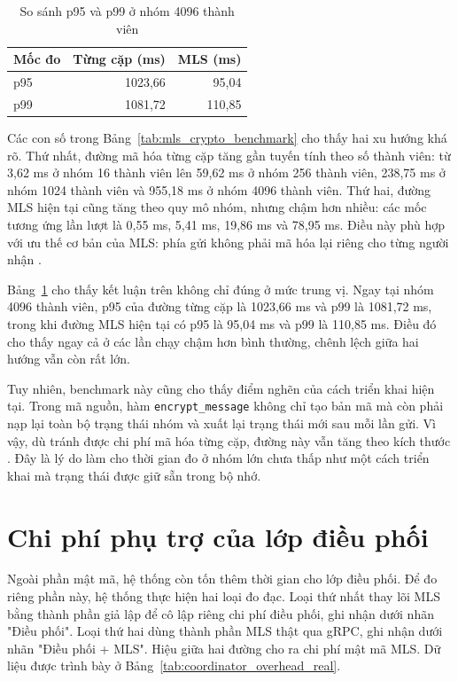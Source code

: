 \documentclass[../DoAn.tex]{subfiles}
\begin{document}
\begin{table}[htbp]
	\centering
	\caption{So sánh p95 và p99 ở nhóm 4096 thành viên}
	\label{tab:mls_crypto_tail_latency}
	\begin{tabular}{|l|r|r|}
		\hline
		\textbf{Mốc đo} & \textbf{Từng cặp (ms)} & \textbf{MLS (ms)} \\
		\hline
		p95 & 1023,66 & 95,04 \\
		\hline
		p99 & 1081,72 & 110,85 \\
		\hline
	\end{tabular}
\end{table}
	
Các con số trong Bảng~\ref{tab:mls_crypto_benchmark} cho thấy hai xu hướng khá rõ. Thứ nhất, đường mã hóa từng cặp tăng gần tuyến tính theo số thành viên: từ 3,62 ms ở nhóm 16 thành viên lên 59,62 ms ở nhóm 256 thành viên, 238,75 ms ở nhóm 1024 thành viên và 955,18 ms ở nhóm 4096 thành viên. Thứ hai, đường MLS hiện tại cũng tăng theo quy mô nhóm, nhưng chậm hơn nhiều: các mốc tương ứng lần lượt là 0,55 ms, 5,41 ms, 19,86 ms và 78,95 ms. Điều này phù hợp với ưu thế cơ bản của MLS: phía gửi không phải mã hóa lại riêng cho từng người nhận \cite{rfc9420}.

Bảng~\ref{tab:mls_crypto_tail_latency} cho thấy kết luận trên không chỉ đúng ở mức trung vị. Ngay tại nhóm 4096 thành viên, p95 của đường từng cặp là 1023,66 ms và p99 là 1081,72 ms, trong khi đường MLS hiện tại có p95 là 95,04 ms và p99 là 110,85 ms. Điều đó cho thấy ngay cả ở các lần chạy chậm hơn bình thường, chênh lệch giữa hai hướng vẫn còn rất lớn.

Tuy nhiên, benchmark này cũng cho thấy điểm nghẽn của cách triển khai hiện tại. Trong mã nguồn, hàm \texttt{encrypt\_message} không chỉ tạo bản mã mà còn phải nạp lại toàn bộ trạng thái nhóm và xuất lại trạng thái mới sau mỗi lần gửi. Vì vậy, dù tránh được chi phí mã hóa từng cặp, đường này vẫn tăng theo kích thước . Đây là lý do làm cho thời gian đo ở nhóm lớn chưa thấp như một cách triển khai mà trạng thái được giữ sẵn trong bộ nhớ.
	
	\section{Chi phí phụ trợ của lớp điều phối}
	\label{sec:coordinator_overhead}
	
Ngoài phần mật mã, hệ thống còn tốn thêm thời gian cho lớp điều phối. Để đo riêng phần này, hệ thống thực hiện hai loại đo đạc. Loại thứ nhất thay lõi MLS bằng thành phần giả lập để cô lập riêng chi phí điều phối, ghi nhận dưới nhãn "Điều phối". Loại thứ hai dùng thành phần MLS thật qua gRPC, ghi nhận dưới nhãn "Điều phối + MLS". Hiệu giữa hai đường cho ra chi phí mật mã MLS. Dữ liệu được trình bày ở Bảng~\ref{tab:coordinator_overhead_real}.
	
\end{document}
